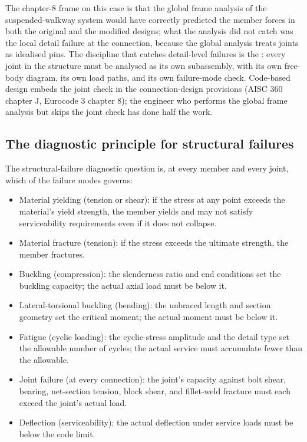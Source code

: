 The chapter-8 frame on this case is that the global frame analysis
of the suspended-walkway system would have correctly predicted the
member forces in both the original and the modified designs; what
the analysis did not catch was the local detail failure at the
connection, because the global analysis treats joints as idealised
pins. The discipline that catches detail-level failures is the
: every joint in the structure must be
analysed as its own subassembly, with its own free-body diagram,
its own load paths, and its own failure-mode check. Code-based
design embeds the joint check in the connection-design provisions
(AISC 360 chapter J, Eurocode 3 chapter 8); the engineer who
performs the global frame analysis but skips the joint check has
done half the work.

\subsection{The diagnostic principle for structural failures}

The structural-failure diagnostic question is, at every member and
every joint, which of the failure modes governs:

\begin{itemize}[leftmargin=*]
  \item Material yielding (tension or shear): if the stress at any
    point exceeds the material's yield strength, the member yields
    and may not satisfy serviceability requirements even if it
    does not collapse.
  \item Material fracture (tension): if the stress exceeds the
    ultimate strength, the member fractures.
  \item Buckling (compression): the slenderness ratio and end
    conditions set the buckling capacity; the actual axial load
    must be below it.
  \item Lateral-torsional buckling (bending): the unbraced length
    and section geometry set the critical moment; the actual moment
    must be below it.
  \item Fatigue (cyclic loading): the cyclic-stress amplitude and
    the detail type set the allowable number of cycles; the actual
    service must accumulate fewer than the allowable.
  \item Joint failure (at every connection): the joint's capacity
    against bolt shear, bearing, net-section tension, block shear,
    and fillet-weld fracture must each exceed the joint's actual
    load.
  \item Deflection (serviceability): the actual deflection under
    service loads must be below the code limit.
\end{itemize}

